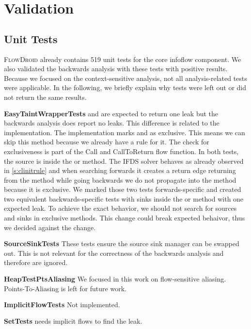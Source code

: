 \documentclass[../draft.tex]{subfiles}
\begin{document}
    \chapter{Validation}
    \section{Unit Tests}
    \textsc{FlowDroid} already contains 519 unit tests for the core infoflow component. We also validated the backwards analysis with these tests with positive results. Because we focused on the context-sensitive analysis, not all analysis-related tests were applicable. In the following, we briefly explain why tests were left out or did not return the same results.

    \textbf{EasyTaintWrapperTests}  and  are expected to return one leak but the backwards analysis does report no leaks. This difference is related to the  implementation. The implementation marks  and  as exclusive. This means we can skip this method because we already have a rule for it. The check for exclusiveness is part of the Call and CallToReturn flow function. In both tests, the source is inside the  or  method. The IFDS solver behaves as already observed in \autoref{s:clinitrule} and when searching forwards it creates a return edge returning from the method while going backwards we do not propagate into the method because it is exclusive.
    We marked those two tests forwards-specific and created two equivalent backwards-specific tests with sinks inside the  or  method with one expected leak.
    To achieve the exact behavior, we should not search for sources and sinks in exclusive methods. This change could break expected behaivor, thus we decided against the change.
    
    \textbf{SourceSinkTests} These tests ensure the source sink manager can be swapped out. This is not relevant for the correctness of the backwards analysis and therefore are ignored.

    \textbf{HeapTestPtsAliasing} We focused in this work on flow-sensitive aliasing. Points-To-Aliasing is left for future work.
    
    \textbf{ImplicitFlowTests} Not implemented. 

    \textbf{SetTests}  needs implicit flows to find the leak.
\end{document}
